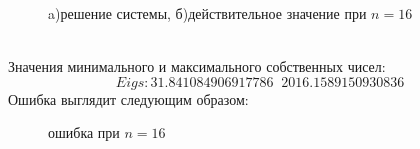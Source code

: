 \documentclass[12pt,a4paper]{scrartcl}
\begin{document}
\begin{figure}[h]
	\begin{minipage}[h]{0.49\linewidth}
	\end{minipage}
	\hfill
	\begin{minipage}[h]{0.49\linewidth}
	\end{minipage}
	\caption{a)решение системы, б)действительное значение при $n=16$}
	\label{ris:image1}
\end{figure}
\\
Значения минимального и максимального собственных чисел: 
\[
	Eigs:  31.841084906917786\;\;2016.1589150930836
\]
Ошибка выглядит следующим образом:
\\
\begin{figure}[h]
	\caption{ошибка при $n=16$}
	\label{ris:image}
\end{figure}
\end{document}
